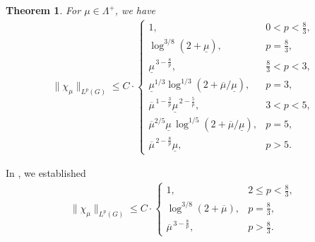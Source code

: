 \documentclass{amsart}
\numberwithin{equation}{section}
\newtheorem{thm}{Theorem}[section]
\numberwithin{equation}{section}
\begin{document}

\begin{thm}\label{thm: Lp}  
For $\mu\in\Lambda^+$, we have 
    \begin{align}\label{eq: singular bound}
\|\chi_\mu\|_{L^p(G)}
\leq C\cdot
\begin{cases}
1, & 0<p<\frac83,\\[2mm]
\log^{3/8}(2+\underline{\mu}), & p=\frac83,\\[2mm]
\underline{\mu}^{\,3-\frac{8}{p}}, & \frac83<p<3,\\[2mm]
\underline{\mu}^{1/3}\log^{1/3}(2+\overline{\mu}/\underline{\mu}), & p=3,\\[2mm]
\overline{\mu}^{\,1-\frac{3}{p}}\underline{\mu}^{\,2-\frac{5}{p}}, & 3<p<5,\\[2mm]
\overline{\mu}^{2/5}\underline{\mu}\,\log^{1/5}(2+\overline{\mu}/\underline{\mu}), & p=5,\\[2mm]
\overline{\mu}^{\,2-\frac{8}{p}}\underline{\mu}, & p>5.
\end{cases}
\end{align}
\end{thm}


In \cite{Zha26}, we established
    \begin{align}\label{eq: regular bound}
        \|\chi_\mu\|_{L^p(G)}
\leq C\cdot
\begin{cases}
1, & 2\leq p<\frac83,\\[2mm]
\log^{3/8}(2+\overline{\mu}), & p=\frac83,\\[2mm]
\overline{\mu}^{\,3-\frac{8}{p}}, & p>\frac83.
\end{cases}
    \end{align}
\end{document}
